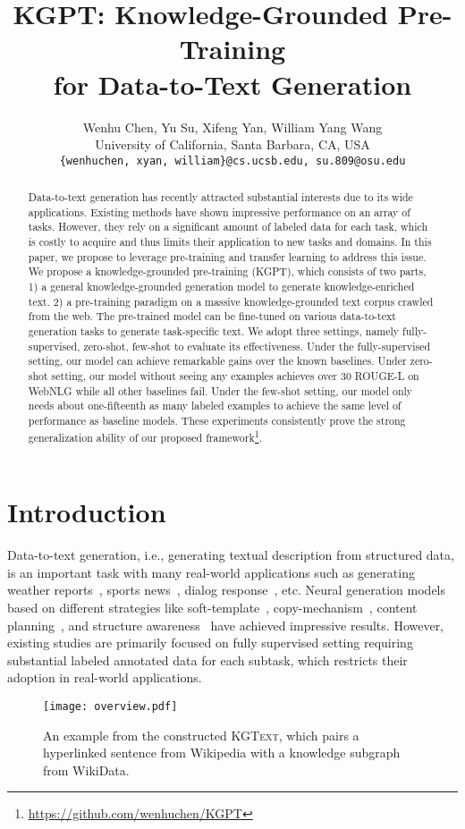 \documentclass[11pt,a4paper]{article}
\title{KGPT: Knowledge-Grounded Pre-Training \\ for Data-to-Text Generation}
\author{Wenhu Chen, Yu Su, Xifeng Yan, William Yang Wang \\
University of California, Santa Barbara, CA, USA\\
\tt{\{wenhuchen, xyan, william\}@cs.ucsb.edu,} \tt{su.809@osu.edu}\\
}
\date{}
\newcommand{\dataset}{\textsc{KGText}\xspace}
\begin{document}
\maketitle
\begin{abstract}
Data-to-text generation has recently attracted substantial interests due to its wide applications. Existing methods have shown impressive performance on an array of tasks. However, they rely on a significant amount of labeled data for each task, which is costly to acquire and thus limits their application to new tasks and domains. In this paper, we propose to leverage pre-training and transfer learning to address this issue. We propose a knowledge-grounded pre-training (KGPT), which consists of two parts, 1) a general knowledge-grounded generation model to generate knowledge-enriched text. 2) a pre-training paradigm on a massive knowledge-grounded text corpus crawled from the web. The pre-trained model can be fine-tuned on various data-to-text generation tasks to generate task-specific text. We adopt three settings, namely fully-supervised, zero-shot, few-shot to evaluate its effectiveness. Under the fully-supervised setting, our model can achieve remarkable gains over the known baselines. Under zero-shot setting, our model without seeing any examples achieves over 30 ROUGE-L on WebNLG while all other baselines fail. Under the few-shot setting, our model only needs about one-fifteenth as many labeled examples to achieve the same level of performance as baseline models. These experiments consistently prove the strong generalization ability of our proposed framework\footnote{\url{https://github.com/wenhuchen/KGPT}}.   
\end{abstract}

\section{Introduction}
Data-to-text generation, i.e., generating textual description from structured data, is an important task with many real-world applications such as generating weather reports~\cite{liang2009learning}, sports news~\cite{wiseman-etal-2017-challenges}, dialog response~\cite{wen2016multi,dusek2019e2e}, etc. Neural generation models based on different strategies like soft-template~\cite{wiseman2018learning,ye2020variational}, copy-mechanism~\cite{see2017get}, content planning~\cite{reed2018can,moryossef2019step}, and structure awareness~\cite{liu2018table,colin2019generating} have achieved impressive results. However, existing studies are primarily focused on fully supervised setting requiring substantial labeled annotated data for each subtask, which restricts their adoption in real-world applications. 
\begin{figure}[!t]
    \centering
    \texttt{[image: overview.pdf]}
    \caption{An example from the constructed \dataset, which pairs a hyperlinked sentence from Wikipedia with a knowledge subgraph from WikiData.}
    \label{fig:example}
    \vspace{-2ex}
\end{figure}
\end{document}
